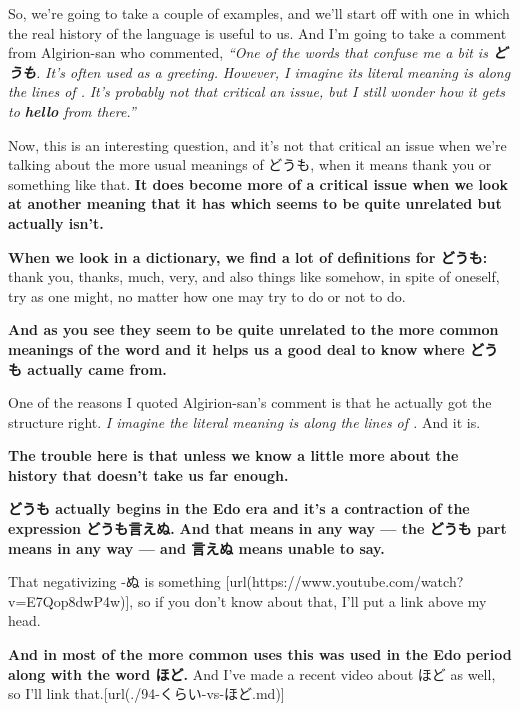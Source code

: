 So, we're going to take a couple of examples, and we'll start off with one in which the real history of the language is useful to us. And I'm going to take a comment from Algirion-san who commented, {\em “One of the words that confuse me a bit is {\bf どうも}.} {\em It's often used as a greeting.} {\em However, I imagine its literal meaning is along the lines of .} {\em It's probably not that critical an issue, but I still wonder how it gets to {\bf hello} from there.”}

\startsectionlevel[title={どうも},reference={どうも}]

Now, this is an interesting question, and it's not that critical an issue when we're talking about the more usual meanings of どうも, when it means thank you or something like that. {\bf It does become more of a critical issue when we look at another meaning that it has which seems to be quite unrelated but actually isn't.}

\thinrule

{\bf When we look in a dictionary, we find a lot of definitions for どうも:} thank you, thanks, much, very, and also things like somehow, in spite of oneself, try as one might, no matter how one may try to do or not to do.

{}

{\bf And as you see they seem to be quite unrelated to the more common meanings of the word and it helps us a good deal to know where どうも actually came from.}

One of the reasons I quoted Algirion-san's comment is that he actually got the structure right. {\em I imagine the literal meaning is along the lines of .} And it is.

{\bf The trouble here is that unless we know a little more about the history that doesn't take us far enough.}

\thinrule

{\bf どうも actually begins in the Edo era and it's a contraction of the expression どうも言えぬ.} {\bf And that means in any way --- the どうも part means in any way --- and 言えぬ means unable to say.}

That negativizing -ぬ is something [url(https://www.youtube.com/watch?v=E7Qop8dwP4w)], so if you don't know about that, I'll put a link above my head.

{}

{\bf And in most of the more common uses this was used in the Edo period along with the word ほど.} And I've made a recent video about ほど as well, so I'll link that.\goto{{[}94{]}}[url(./94-くらい-vs-ほど.md)]

